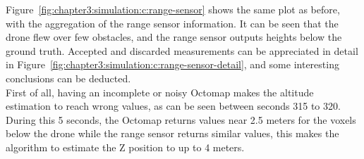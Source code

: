 Figure~\ref{fig:chapter3:simulation:c:range-sensor} shows the same plot as before, with the aggregation of the range sensor information. It can be seen that the drone flew over few obstacles, and the range sensor outputs heights below the ground truth. Accepted and discarded measurements can be appreciated in detail in Figure~\ref{fig:chapter3:simulation:c:range-sensor-detail}, and some interesting conclusions can be deducted. \\

First of all, having an incomplete or noisy Octomap makes the altitude estimation to reach wrong values, as can be seen between seconds 315 to 320. During this 5 seconds, the Octomap returns values near 2.5 meters for the voxels below the drone while the range sensor returns similar values, this makes the algorithm to estimate the Z position to up to 4 meters.\\
